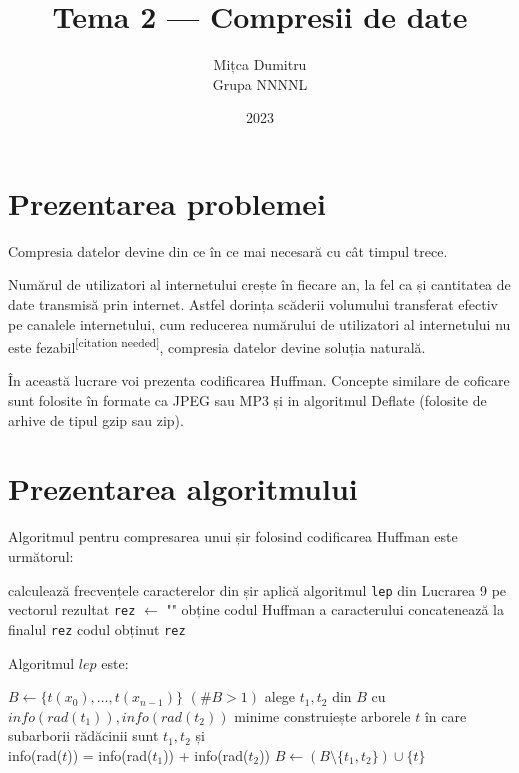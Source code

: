 \documentclass{article}
\title{Tema 2 --- Compresii de date}
\author{
    Mițca Dumitru\\
    Grupa NNNNL
}
\date{2023}
\begin{document}
    \maketitle

    \hypersetup{linkbordercolor=1 1 1}
    \renewcommand*\contentsname{Cuprins}
    \tableofcontents
    \hypersetup{linkbordercolor=1 0 0}

    \newpage

    \section{Prezentarea problemei}
    Compresia datelor devine din ce în ce mai necesară cu cât timpul trece.

    Numărul de utilizatori al internetului crește în fiecare an, la fel ca și cantitatea de date
    transmisă prin internet. Astfel dorința scăderii volumului transferat efectiv pe canalele
    internetului, cum reducerea numărului de utilizatori al internetului nu este
    fezabil\textsuperscript{[citation needed]}, compresia datelor devine soluția naturală.

    În această lucrare voi prezenta codificarea Huffman. Concepte similare de coficare sunt folosite în
    formate ca JPEG sau MP3 și in algoritmul Deflate (folosite de arhive de tipul gzip sau zip).

    \section{Prezentarea algoritmului}

    Algoritmul pentru compresarea unui șir folosind codificarea Huffman este următorul:

    \begin{algorithmic}[1]
        \State calculează frecvențele caracterelor din șir
        \State aplică algoritmul \texttt{lep} din Lucrarea 9 pe vectorul rezultat
        \State \texttt{rez} $\gets$ ""
            \State obține codul Huffman a caracterului
            \State concatenează la finalul \texttt{rez} codul obținut
        \EndFor
        \State
        \Return \texttt{rez}
    \end{algorithmic}

    Algoritmul $lep$ este:
    \begin{algorithmic}[1]
            \State $B \gets \{t(x_0), \dots, t(x_{n-1})\}$
            \While $(\#B > 1)$
                \State alege $t_1, t_2$ din $B$ cu $info(rad(t_1)), info(rad(t_2))$ minime
                \State construiește arborele $t$ în care subarborii rădăcinii sunt $t_1, t_2$ și \\ \hphantom{lol} info(rad($t$)) = info(rad($t_1$)) + info(rad($t_2$))
                \State $B \gets (B \setminus \{t_1, t_2\}) \cup \{t\}$
            \EndWhile
        \EndProcedure
    \end{algorithmic}
\end{document}
